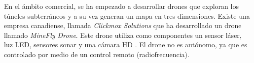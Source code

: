 
En el ámbito comercial, se ha empezado a desarrollar drones que exploran los túneles
subterráneos y a su vez generan un mapa en tres dimensiones. Existe una empresa canadiense,
llamada \textit{Clickmox Solutions} que ha desarrollado un drone llamado
\textit{MineFly Drone}. Este drone utiliza como componentes un sensor láser, luz LED,
sensores sonar y una cámara HD \cite{Solutions2016}. El drone no es autónomo, ya que es
controlado por medio de un control remoto (radiofrecuencia).


